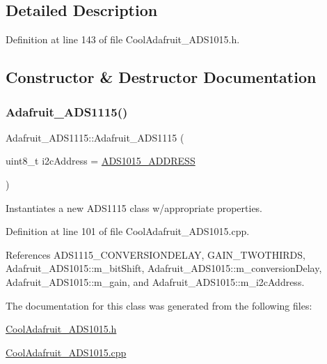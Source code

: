 \subsection{Detailed Description}


Definition at line 143 of file Cool\+Adafruit\+\_\+\+A\+D\+S1015.\+h.



\subsection{Constructor \& Destructor Documentation}
\mbox{\label{class_adafruit___a_d_s1115_a7058cf2c75b673fb0b0a8936c3edd1fd}} 
\subsubsection{\texorpdfstring{Adafruit\+\_\+\+A\+D\+S1115()}{Adafruit\_ADS1115()}}
{\footnotesize\ttfamily Adafruit\+\_\+\+A\+D\+S1115\+::\+Adafruit\+\_\+\+A\+D\+S1115 (\begin{DoxyParamCaption}\item[{uint8\+\_\+t}]{i2c\+Address = {\ttfamily \hyperlink{_cool_adafruit___a_d_s1015_8h_ae55d158023984e8f0ddc80b58d5b30dc}{A\+D\+S1015\+\_\+\+A\+D\+D\+R\+E\+SS}} }\end{DoxyParamCaption})}



Instantiates a new A\+D\+S1115 class w/appropriate properties. 



Definition at line 101 of file Cool\+Adafruit\+\_\+\+A\+D\+S1015.\+cpp.



References A\+D\+S1115\+\_\+\+C\+O\+N\+V\+E\+R\+S\+I\+O\+N\+D\+E\+L\+AY, G\+A\+I\+N\+\_\+\+T\+W\+O\+T\+H\+I\+R\+DS, Adafruit\+\_\+\+A\+D\+S1015\+::m\+\_\+bit\+Shift, Adafruit\+\_\+\+A\+D\+S1015\+::m\+\_\+conversion\+Delay, Adafruit\+\_\+\+A\+D\+S1015\+::m\+\_\+gain, and Adafruit\+\_\+\+A\+D\+S1015\+::m\+\_\+i2c\+Address.



The documentation for this class was generated from the following files\+:\begin{DoxyCompactItemize}
\item 
\hyperlink{_cool_adafruit___a_d_s1015_8h}{Cool\+Adafruit\+\_\+\+A\+D\+S1015.\+h}\item 
\hyperlink{_cool_adafruit___a_d_s1015_8cpp}{Cool\+Adafruit\+\_\+\+A\+D\+S1015.\+cpp}\end{DoxyCompactItemize}
